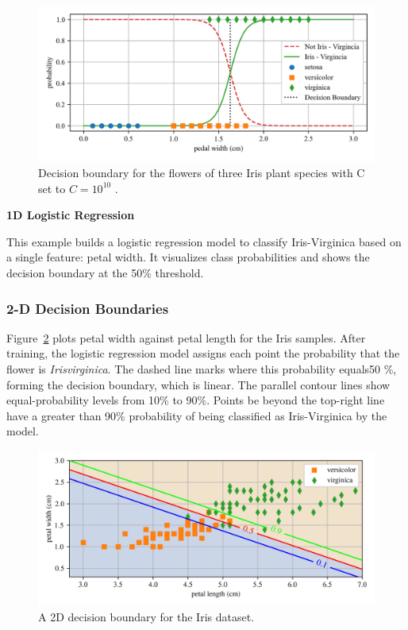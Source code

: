 \documentclass[12pt,letter]{article}
\begin{document}
\begin{figure}[H]
	\centering
	\includegraphics[width=6.5in]{../figures/Iris_dataset_decision_boundary_1D.png}
	\caption{Decision boundary for the flowers of three Iris plant species with C set to $C=10^{10}$ .}
	\label{fig:Iris_dataset_decision_boundary_1D}
\end{figure}

\begin{example}
\textbf{1D Logistic Regression}

\noindent This example builds a logistic regression model to classify Iris-Virginica based on a single feature: petal width. It visualizes class probabilities and shows the decision boundary at the 50\% threshold.
\end{example}

\subsubsection{2-D Decision Boundaries}


Figure~\ref{fig:Iris_dataset_decision_boundary_2D} plots petal width against petal length for the Iris samples. After training, the logistic regression model assigns each point the probability that the flower is \textit{Irisvirginica}. The dashed line marks where this probability equals50 \%, forming the decision boundary, which is linear. The parallel contour lines show equal-probability levels from 10\% to 90\%. Points be beyond the top-right line have a greater than 90\% probability  of being classified as Iris-Virginica by the model.



		\begin{figure}[H]
			\centering
			\includegraphics[width=6.5in]{../figures/Iris_dataset_decision_boundary_2D.png}
			\caption{A 2D decision boundary for the Iris dataset.}
			\label{fig:Iris_dataset_decision_boundary_2D}
		\end{figure}
\end{document}
